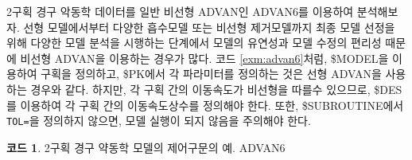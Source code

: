 \documentclass[
  11pt,
  krantz2, a4paper, twoside]{krantz}
\theoremstyle{definition}
\theoremstyle{definition}
\newtheorem{example}{코드}[chapter]
\theoremstyle{definition}
\theoremstyle{remark}
\begin{document}
2구획 경구 악동학 데이터를 일반 비선형 ADVAN인 ADVAN6를 이용하여 분석해보자. 선형 모델에서부터 다양한 흡수모델 또는 비선형 제거모델까지 최종 모델 선정을 위해 다양한 모델 분석을 시행하는 단계에서 모델의 유연성과 모델 수정의 편리성 때문에 비선형 ADVAN을 이용하는 경우가 많다. 코드 \ref{exm:advan6}처럼, \$MODEL을 이용하여 구획을 정의하고, \$PK에서 각 파라미터를 정의하는 것은 선형 ADVAN을 사용하는 경우와 같다. 하지만, 각 구획 간의 이동속도가 비선형을 따를수 있으므로, \$DES를 이용하여 각 구획 간의 이동속도상수를 정의해야 한다. 또한, \$SUBROUTINE에서 \texttt{TOL=}을 정의하지 않으면, 모델 실행이 되지 않음을 주의해야 한다.

\begin{example}
\protect\hypertarget{exm:advan6}{}{\label{exm:advan6} }2구획 경구 약동학 모델의 제어구문의 예. ADVAN6
\end{example}
\vspace{-5ex}
\end{document}
